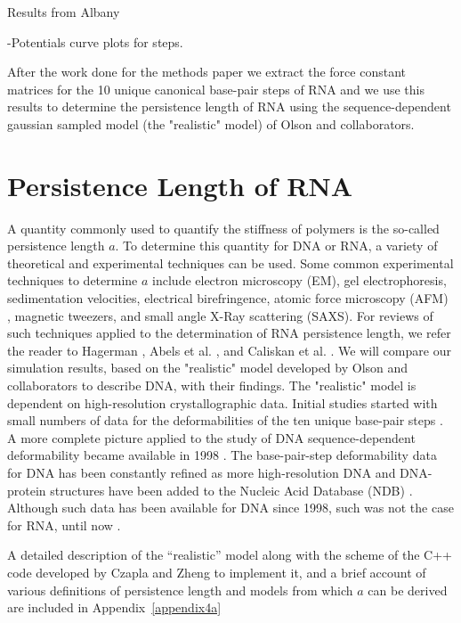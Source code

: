 Results from Albany

-Potentials curve plots for steps.



After the work done for the methods paper we extract the force
constant matrices for the 10 unique canonical base-pair steps of RNA
and we use this results to determine the persistence length of RNA
using the sequence-dependent gaussian sampled model (the "realistic"
model) of Olson and collaborators.




\section{Persistence Length of RNA}
A quantity commonly used to  quantify the stiffness of polymers is the
so-called persistence  length $a$. To determine this  quantity for DNA
or RNA,  a variety of  theoretical and experimental techniques  can be
used.  Some  common experimental  techniques to determine  $a$ include
electron   microscopy   (EM),   gel   electrophoresis,   sedimentation
velocities, electrical birefringence,  atomic force microscopy (AFM) ,
magnetic  tweezers,  and small  angle  X-Ray  scattering (SAXS).   For
reviews  of  such  techniques  applied  to the  determination  of  RNA
persistence    length,    we   refer    the    reader   to    Hagerman
\cite{hagerman1997}, Abels  et al.  \cite{abels2005},  and Caliskan et
al.   \cite{caliskan2005}.  We  will compare  our  simulation results,
based on  the "realistic" model  developed by Olson  and collaborators
\cite{olson1995} to describe DNA, with their findings. The "realistic"
model is dependent  on high-resolution crystallographic data.  Initial
studies started with small numbers  of data for the deformabilities of
the  ten unique  base-pair  steps \cite{olson1995}.   A more  complete
picture applied  to the study of DNA  sequence-dependent deformability
became  available   in  1998  \cite{olson1998}.    The  base-pair-step
deformability  data  for  DNA  has  been constantly  refined  as  more
high-resolution DNA and DNA-protein  structures have been added to the
Nucleic Acid Database (NDB) \cite{balasubramanian2009}.  Although such
data has been available for DNA  since 1998, such was not the case for
RNA, until now \cite{olson2009}.

A detailed description of the  ``realistic'' model along with the scheme
of the C++  code developed by Czapla and Zheng to  implement it, and a
brief account of various  definitions of persistence length and models
from which $a$ can be derived are included in Appendix~\ref{appendix4a}





